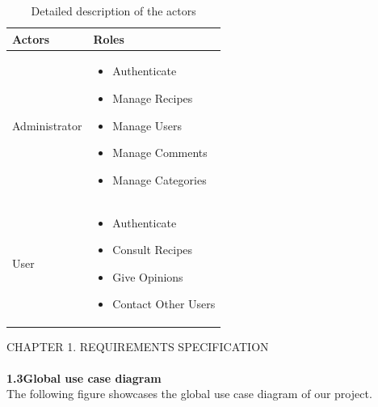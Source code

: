 \documentclass{article}
\begin{document}
\begin{table}[h]
    \centering
    \begin{tabularx}{\textwidth}{X|X}
        \toprule
        \textbf{\color{blue!70} Actors} & \textbf{\color{blue!70} Roles} \\ 
        \midrule
        Administrator &  \begin{itemize}[label=$\bullet$]
	\item Authenticate
	\item Manage Recipes	
	\item Manage Users
	\item Manage Comments 
	\item Manage Categories
\end{itemize} \\
        \midrule
        User & \begin{itemize}[label=$\bullet$]
	\item Authenticate
	\item Consult Recipes
	\item Give Opinions
	\item Contact Other Users
\end{itemize}\\
        \bottomrule
    \end{tabularx}
    \caption{Detailed description of the actors}
    \label{tab:actors_roles}
\end{table}
\newpage
\noindent
CHAPTER 1.  REQUIREMENTS SPECIFICATION \\
\underline{\hspace{\textwidth}} \vspace{0.2cm}\\
{\Large \textbf{1.3\hspace{1em}Global use case diagram}}\vspace{0.2cm}
\\The following figure showcases the global use case diagram of our project.\vspace{0.2cm}
\end{document}
